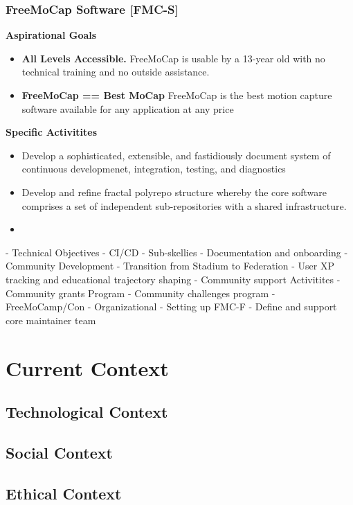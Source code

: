 \documentclass[11pt]{article}
\begin{document}
\subsubsection{\textbf{FreeMoCap Software [FMC-S]}}
\textbf{Aspirational Goals}
\begin{itemize}
  \item \textbf{All Levels Accessible.} FreeMoCap is usable by a 13-year old with no technical training and no outside assistance.
  \item \textbf{FreeMoCap == Best MoCap} FreeMoCap is the best motion capture software available for any application at any price
\end{itemize}

\textbf{Specific Activitites}
\begin{itemize}
  \item Develop a sophisticated, extensible, and fastidiously document system of continuous developmenet, integration, testing, and diagnostics
  \item Develop and refine fractal polyrepo structure whereby the core software comprises a set of independent sub-repositories with a shared infrastructure.
  \item 
\end{itemize}

 - Technical Objectives
    - CI/CD
    - Sub-skellies
    - Documentation and onboarding
 - Community Development
    - Transition from Stadium to Federation \cite{egbahl2020}
    - User XP tracking and educational trajectory shaping
    - Community support Activitites
      - Community grants Program
      - Community challenges program 
      - FreeMoCamp/Con
 - Organizational 
    - Setting up FMC-F
    - Define and support core maintainer team

\newpage

\section{Current Context}
\subsection{Technological Context}
\subsection{Social Context}
\subsection{Ethical Context}
\end{document}
